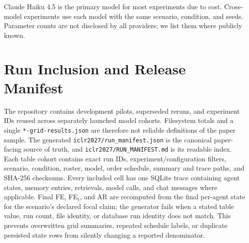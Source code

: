 Claude Haiku 4.5 is the primary model for most experiments due to cost. Cross-model experiments use each model with the same scenario, condition, and seeds. Parameter counts are not disclosed by all providers; we list them where publicly known.

\section{Run Inclusion and Release Manifest}
\label{app:scale}

The repository contains development pilots, superseded reruns, and experiment IDs reused across separately launched model cohorts. Filesystem totals and a single \texttt{*-grid-results.json} are therefore not reliable definitions of the paper sample. The generated \texttt{iclr2027/run\_manifest.json} is the canonical paper-facing source of truth, and \texttt{iclr2027/RUN\_MANIFEST.md} is its readable index. Each table cohort contains exact run IDs, experiment/configuration filters, scenario, condition, roster, model, order schedule, summary and trace paths, and SHA-256 checksums. Every included cell has one SQLite trace containing agent states, memory entries, retrievals, model calls, and chat messages where applicable. Final FE, FE$_\text{t}$, and AR are recomputed from the final per-agent state for the scenario's declared focal claim; the generator fails when a stated table value, run count, file identity, or database run identity does not match. This prevents overwritten grid summaries, repeated schedule labels, or duplicate persisted state rows from silently changing a reported denominator.
